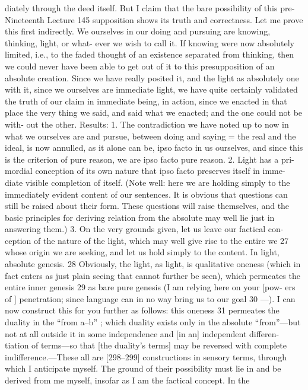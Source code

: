 diately through the deed itself. But I claim that the bare possibility of this pre-Nineteenth Lecture
145
supposition shows its truth and correctness. Let me prove this first indirectly.
We ourselves in our doing and pursuing are knowing, thinking, light, or what-
ever we wish to call it. If knowing were now absolutely limited, i.e., to the
faded thought of an existence separated from thinking, then we could never
have been able to get out of it to this presupposition of an absolute creation.
Since we have really posited it, and the light as absolutely one with it, since
we ourselves are immediate light, we have quite certainly validated the truth
of our claim in immediate being, in action, since we enacted in that place the
very thing we said, and said what we enacted; and the one could not be with-
out the other. Results: 1. The contradiction we have noted up to now in what
we ourselves are and pursue, between doing and saying = the real and the ideal,
is now annulled, as it alone can be, ipso facto in us ourselves, and since this is
the criterion of pure reason, we are ipso facto pure reason. 2. Light has a pri-
mordial conception of its own nature that ipso facto preserves itself in imme-
diate visible completion of itself. (Note well: here we are holding simply to the
immediately evident content of our sentences. It is obvious that questions can
still be raised about their form. These questions will raise themselves, and the
basic principles for deriving relation from the absolute may well lie just in
answering them.) 3. On the very grounds given, let us leave our factical con-
ception of the nature of the light, which may well give rise to the entire we 27
whose origin we are seeking, and let us hold simply to the content. In light,
absolute genesis. 28 Obviously, the light, as light, is qualitative oneness (which in
fact enters as just plain seeing that cannot further be seen), which permeates
the entire inner genesis 29 as bare pure genesis (I am relying here on your [pow-
ers of ] penetration; since language can in no way bring us to our goal 30 —). I
can now construct this for you further as follows: this oneness 31 permeates the
duality in the “from a–b” ; which duality exists only in the absolute “from”—but
not at all outside it in some independence and [in an] independent differen-
tiation of terms—so that [the duality’s terms] may be reversed with complete
indifference.—These all are [298–299] constructions in sensory terms,
through which I anticipate myself. The ground of their possibility must lie in
and be derived from me myself, insofar as I am the factical concept. In the
